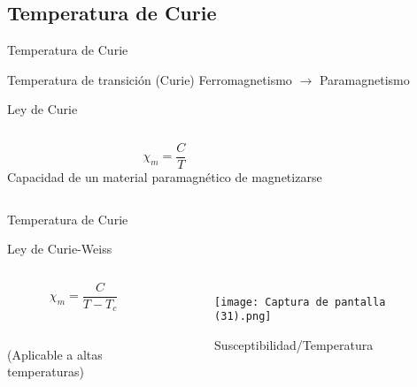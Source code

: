 \documentclass[10pt]{beamer}
\begin{document}

        
    \subsection{\textrm{Temperatura de Curie}}

    
    \begin{frame}{\textrm{Temperatura de Curie}} 
        \begin{block} {Temperatura de transición (Curie)}
            Ferromagnetismo  $\rightarrow$   Paramagnetismo
        \end{block}

        \vspace{1cm}
        \begin{block} {Ley de Curie}
            \begin{columns}
                \begin{equation*} 
                    \chi_m=\frac{C}{T}
                \end{equation*}
                Capacidad de un material paramagnético de magnetizarse
            \end{columns}       
        \end{block}
            
       
    \end{frame}
    
    \begin{frame}{\textrm{Temperatura de Curie}}
        \begin{block}{Ley de Curie-Weiss}
        \begin{columns}
             \begin{equation*}
                 \chi_m=\frac{C}{T-T_c}
             \end{equation*}
             \\
             \\
             \centering
                 (Aplicable a altas temperaturas)
                \begin{figure}
                    \centering
                    \texttt{[image: Captura de pantalla (31).png]}
                    \caption{Susceptibilidad/Temperatura}
                \end{figure}
     
        \end{columns}
            
        \end{block}
    \end{frame}
\end{document}
